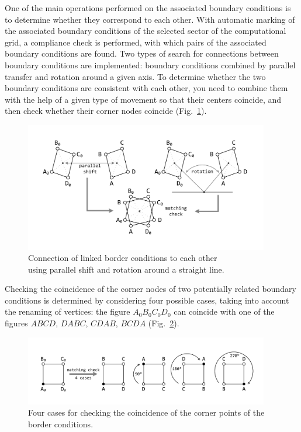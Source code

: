 \documentclass[
11pt,%
tightenlines,%
twoside,%
onecolumn,%
nofloats,%
nobibnotes,%
nofootinbib,%
superscriptaddress,%
noshowpacs,%
centertags]%
{revtex4}
\begin{document}
One of the main operations performed on the associated boundary conditions is to determine whether they correspond to each other.
With automatic marking of the associated boundary conditions of the selected sector of the computational grid, a compliance check is performed, with which pairs of the associated boundary conditions are found.
Two types of search for connections between boundary conditions are implemented: boundary conditions combined by parallel transfer and rotation around a given axis.
To determine whether the two boundary conditions are consistent with each other, you need to combine them with the help of a given type of movement so that their centers coincide, and then check whether their corner nodes coincide (Fig.~\ref{fig:match3}).

\begin{figure}[h]
\setcaptionmargin{5mm}
\onelinecaptionsfalse
\includegraphics[width=0.95\textwidth]{pics/match3.pdf}
\caption{Connection of linked border conditions to each other \\ using parallel shift and rotation around a straight line.}
\label{fig:match3}
\end{figure}

Checking the coincidence of the corner nodes of two potentially related boundary conditions is determined by considering four possible cases, taking into account the renaming of vertices: the figure $A_0B_0C_0D_0$ can coincide with one of the figures $ABCD$, $DABC$, $CDAB$, $BCDA$ (Fig.~\ref{fig:match}).

\begin{figure}[h]
\setcaptionmargin{5mm}
\onelinecaptionstrue
\includegraphics[width=0.95\textwidth]{pics/match.pdf}
\caption{Four cases for checking the coincidence of the corner points of the border conditions.}
\label{fig:match}
\end{figure}
\end{document}
